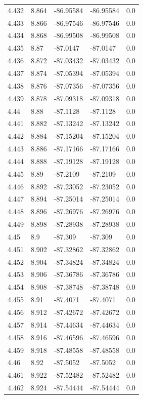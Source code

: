 \begin{tabular}{lllll}
4.432 & 8.864 & -86.95584 & -86.95584 & 0.0 \\
4.433 & 8.866 & -86.97546 & -86.97546 & 0.0 \\
4.434 & 8.868 & -86.99508 & -86.99508 & 0.0 \\
4.435 & 8.87 & -87.0147 & -87.0147 & 0.0 \\
4.436 & 8.872 & -87.03432 & -87.03432 & 0.0 \\
4.437 & 8.874 & -87.05394 & -87.05394 & 0.0 \\
4.438 & 8.876 & -87.07356 & -87.07356 & 0.0 \\
4.439 & 8.878 & -87.09318 & -87.09318 & 0.0 \\
4.44 & 8.88 & -87.1128 & -87.1128 & 0.0 \\
4.441 & 8.882 & -87.13242 & -87.13242 & 0.0 \\
4.442 & 8.884 & -87.15204 & -87.15204 & 0.0 \\
4.443 & 8.886 & -87.17166 & -87.17166 & 0.0 \\
4.444 & 8.888 & -87.19128 & -87.19128 & 0.0 \\
4.445 & 8.89 & -87.2109 & -87.2109 & 0.0 \\
4.446 & 8.892 & -87.23052 & -87.23052 & 0.0 \\
4.447 & 8.894 & -87.25014 & -87.25014 & 0.0 \\
4.448 & 8.896 & -87.26976 & -87.26976 & 0.0 \\
4.449 & 8.898 & -87.28938 & -87.28938 & 0.0 \\
4.45 & 8.9 & -87.309 & -87.309 & 0.0 \\
4.451 & 8.902 & -87.32862 & -87.32862 & 0.0 \\
4.452 & 8.904 & -87.34824 & -87.34824 & 0.0 \\
4.453 & 8.906 & -87.36786 & -87.36786 & 0.0 \\
4.454 & 8.908 & -87.38748 & -87.38748 & 0.0 \\
4.455 & 8.91 & -87.4071 & -87.4071 & 0.0 \\
4.456 & 8.912 & -87.42672 & -87.42672 & 0.0 \\
4.457 & 8.914 & -87.44634 & -87.44634 & 0.0 \\
4.458 & 8.916 & -87.46596 & -87.46596 & 0.0 \\
4.459 & 8.918 & -87.48558 & -87.48558 & 0.0 \\
4.46 & 8.92 & -87.5052 & -87.5052 & 0.0 \\
4.461 & 8.922 & -87.52482 & -87.52482 & 0.0 \\
4.462 & 8.924 & -87.54444 & -87.54444 & 0.0 \\

\end{tabular}
